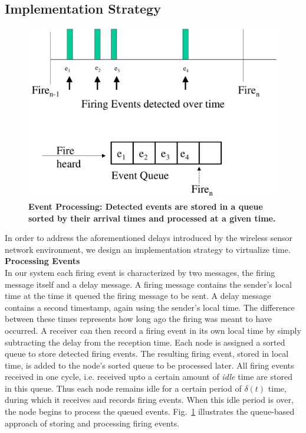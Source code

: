 \subsection{Implementation Strategy}
\label{sec:fitsImplementation}

\begin{figure}[t]
\begin{center}
\includegraphics[width=0.9\hsize]{./figures/sortedQueue.pdf}
\end{center}
\caption{{\small {\bf Event Processing: Detected events are stored in a queue sorted by their arrival times and processed at a given time.}}} 
\label{fig:sortedQueue}
\end{figure}

\noindent
In order to address the aforementioned delays introduced by the wireless
sensor network environment, we design an implementation strategy to virtualize time. \\

\noindent
{\bf Processing Events}  \\
In our system each firing event is characterized by 
two messages, the firing message itself and a delay message. 
A firing message contains the sender's local time at
the time it queued the firing message to be sent. A delay message
contains a second timestamp, again using the sender's local
time. The difference between these times represents how long ago the
firing was meant to have occurred. A receiver can then record a firing
event in its own local time by simply subtracting the delay from the
reception time. Each node is assigned a sorted queue to store
detected firing events. The resulting firing event, stored in local time,
is added to the node's sorted queue to be processed later.
All firing events received in one cycle, i.e. received upto a certain amount of 
\emph{idle} time are stored in this queue.  Thus each node remains idle
for a certain period of $\delta(t)$ time, during which it receives and records
firing events. When this idle period is over, the node begins to process the queued events.
Fig.~\ref{fig:sortedQueue} illustrates the queue-based approach of storing
and processing firing events.

